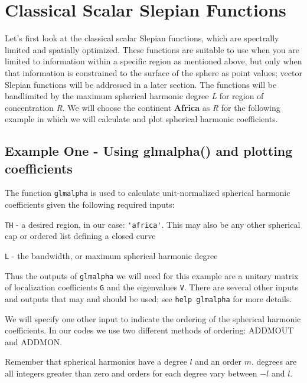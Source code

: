 \documentclass[11pt]{article}
\begin{document}
\section{Classical Scalar Slepian Functions}
%
Let's first look at the classical scalar Slepian functions, which are spectrally limited and spatially optimized. These functions are suitable to use when you are limited to information within a specific region as mentioned above, but only when that information is constrained to the surface of the sphere as point values; vector Slepian functions will be addressed in a later section. The functions will be bandlimited by the maximum spherical harmonic degree \textit{L} for region of concentration \textit{R}. We will choose the continent \textbf{Africa} as \textit{R} for the following example in which we will calculate and plot spherical harmonic coefficients. 

\subsection{Example One - Using glmalpha() and plotting coefficients}

The function \verb+glmalpha+ is used to calculate unit-normalized spherical harmonic coefficients given the following required inputs:

\verb+TH+ - a desired region, in our case: \verb+'africa'+. This may also be any other spherical cap or ordered list defining a closed curve

\verb+L+ - the bandwidth, or maximum spherical harmonic degree

Thus the outputs of \verb+glmalpha+ we will need for this example are a unitary matrix of localization coefficients \verb+G+ and the eigenvalues \verb+V+. There are several other inputs and outputs that may and should be used; see \verb+help glmalpha+ for more details. 

We will specify one other input to indicate the ordering of the spherical harmonic coefficients. In our codes  we use two different methods of ordering: ADDMOUT and ADDMON. 

Remember that spherical harmonics have a degree $l$ and an order $m$. degrees are all integers greater than zero and orders for each degree vary between $-l$ and $l$.
\end{document}

